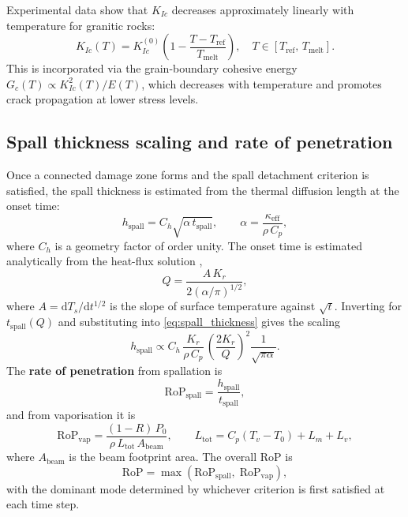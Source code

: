 \documentclass[12pt, a4paper]{article}
\begin{document}
Experimental data \citep{rossi2018effects} show that $K_{Ic}$ decreases
approximately linearly with temperature for granitic rocks:
\begin{equation}
    K_{Ic}(T) = K_{Ic}^{(0)}\!\left(1 - \frac{T - T_\mathrm{ref}}
                                               {T_\mathrm{melt}}\right), \quad
    T \in [T_\mathrm{ref},\, T_\mathrm{melt}].
    \label{eq:Kic_T}
\end{equation}
This is incorporated via the grain-boundary cohesive energy
$G_c(T) \propto K_{Ic}^2(T)/E(T)$, which decreases with temperature and
promotes crack propagation at lower stress levels.

\subsection{Spall thickness scaling and rate of penetration}
\label{sec:spall_scaling}

Once a connected damage zone forms and the spall detachment criterion is
satisfied, the spall thickness is estimated from the thermal diffusion length at
the onset time:
\begin{equation}
    h_\mathrm{spall} = C_h\sqrt{\alpha\,t_\mathrm{spall}},
    \qquad
    \alpha = \frac{\kappa_\mathrm{eff}}{\rho\,C_p},
    \label{eq:spall_thickness}
\end{equation}
where $C_h$ is a geometry factor of order unity.  The onset time is estimated
analytically from the heat-flux solution \citep{hu2018lrst, carslaw1959},
\begin{equation}
    Q = \frac{A\,K_r}{2(\alpha/\pi)^{1/2}},
    \label{eq:Q_onset}
\end{equation}
where $A = \mathrm{d}T_s/\mathrm{d}t^{1/2}$ is the slope of surface temperature
against $\sqrt{t}$.  Inverting for $t_\mathrm{spall}(Q)$ and substituting into
\cref{eq:spall_thickness} gives the scaling
\begin{equation}
    h_\mathrm{spall} \propto C_h\,\frac{K_r}{\rho\,C_p}\,
    \left(\frac{2K_r}{Q}\right)^2 \frac{1}{\sqrt{\pi\alpha}}.
    \label{eq:spall_scaling_explicit}
\end{equation}
The \textbf{rate of penetration} from spallation is
\begin{equation}
    \mathrm{RoP}_\mathrm{spall} = \frac{h_\mathrm{spall}}{t_\mathrm{spall}},
    \label{eq:rop_spall}
\end{equation}
and from vaporisation it is
\begin{equation}
    \mathrm{RoP}_\mathrm{vap} = \frac{(1-R)\,P_0}
                                      {\rho\,L_\mathrm{tot}\,A_\mathrm{beam}},
    \qquad
    L_\mathrm{tot} = C_p(T_v - T_0) + L_m + L_v,
    \label{eq:rop_vap}
\end{equation}
where $A_\mathrm{beam}$ is the beam footprint area.  The overall RoP is
\begin{equation}
    \mathrm{RoP} = \max(\mathrm{RoP}_\mathrm{spall},\;\mathrm{RoP}_\mathrm{vap}),
    \label{eq:rop_total}
\end{equation}
with the dominant mode determined by whichever criterion is first satisfied at
each time step.
\end{document}
